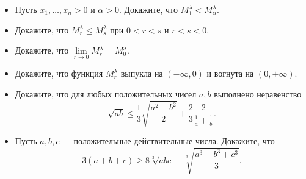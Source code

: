 \documentclass[a4paper,12pt,leqno]{article}
\begin{document}
    \begin{itemize}
        \item[\hw] Пусть $x_1, \dots ,x_n > 0$ и $\alpha > 0$. Докажите, что $M_1^\lambda < M_\alpha^\lambda$. 
        \item[\hw] Докажите, что $M_r^\lambda \leqslant M_s^\lambda$ при $0 < r < s$ и $r < s < 0$. 
        \item[\hw] Докажите, что $\lim\limits_{r \to 0} M_r^\lambda = M_0^\lambda$. 
        \item[\hw] Докажите, что функция $M_r^\lambda$ выпукла на $(-\infty, 0)$ и вогнута на $(0,+\infty)$. 
        \item[\hw] Докажите, что для любых положительных чисел $a, b$ выполнено неравенство
        $$\sqrt{ab} \leqslant \frac{1}{3}\sqrt{\frac{a^2+b^2}{2}} + \frac{2}{3} \frac{2}{\frac{1}{a} + \frac{1}{b}}.$$ 
        \item[\hw] Пусть $a, b, c$ --- положительные действительные числа. Докажите, что 
        $$3(a+b+c) \geqslant 8\sqrt[3]{abc} + \sqrt[3]{\frac{a^3+b^3+c^3}{3}}.$$  
    \end{itemize}

    

	
	
	
	
	
	
	
	
	
	
	
	
	
	
	
	
	
	
	
	
	
	
	
	
	
	
	
\end{document}
